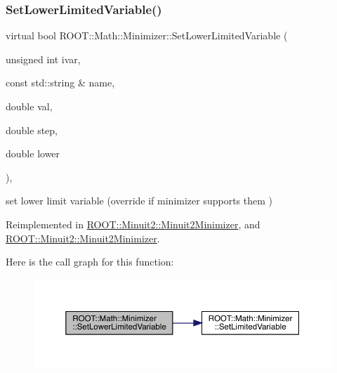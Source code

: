 \subsubsection{\texorpdfstring{SetLowerLimitedVariable()}{SetLowerLimitedVariable()}\hspace{0.1cm}{\footnotesize\ttfamily [2/2]}}
{\footnotesize\ttfamily virtual bool R\+O\+O\+T\+::\+Math\+::\+Minimizer\+::\+Set\+Lower\+Limited\+Variable (\begin{DoxyParamCaption}\item[{unsigned int}]{ivar,  }\item[{const std\+::string \&}]{name,  }\item[{double}]{val,  }\item[{double}]{step,  }\item[{double}]{lower }\end{DoxyParamCaption})\hspace{0.3cm}{\ttfamily [inline]}, {\ttfamily [virtual]}}



set lower limit variable (override if minimizer supports them ) 



Reimplemented in \mbox{\hyperlink{classROOT_1_1Minuit2_1_1Minuit2Minimizer_af38926946e36f7030cfc1c298ab9b222}{R\+O\+O\+T\+::\+Minuit2\+::\+Minuit2\+Minimizer}}, and \mbox{\hyperlink{classROOT_1_1Minuit2_1_1Minuit2Minimizer_af38926946e36f7030cfc1c298ab9b222}{R\+O\+O\+T\+::\+Minuit2\+::\+Minuit2\+Minimizer}}.

Here is the call graph for this function\+:
\nopagebreak
\begin{figure}[H]
\begin{center}
\leavevmode
\includegraphics[width=350pt]{dc/dc4/classROOT_1_1Math_1_1Minimizer_a0fed20bdc58d05ce2b92d2bf47594dfb_cgraph}
\end{center}
\end{figure}
\mbox{\label{classROOT_1_1Math_1_1Minimizer_aabbadaa76bb5723fcaec0eb7d40850b2}} 
